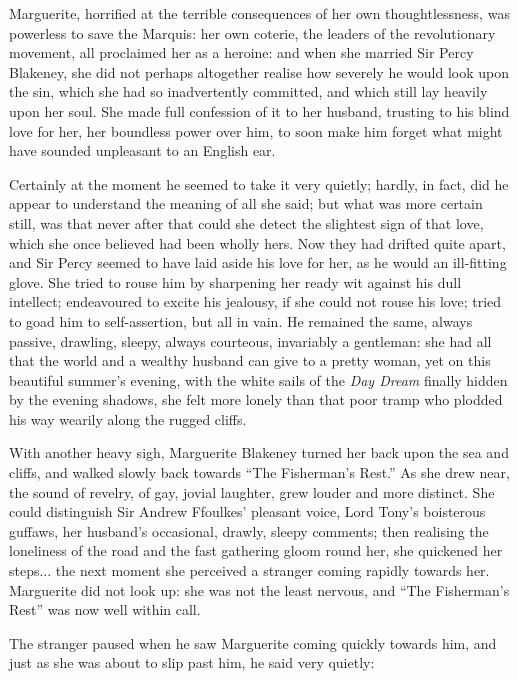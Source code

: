 Marguerite, horrified at the terrible consequences of her own thoughtlessness, was powerless to save the Marquis: her own coterie, the leaders of the revolutionary movement, all proclaimed her as a heroine: and when she married Sir Percy Blakeney, she did not perhaps altogether realise how severely he would look upon the sin, which she had so inadvertently committed, and which still lay heavily upon her soul. She made full confession of it to her husband, trusting to his blind love for her, her boundless power over him, to soon make him forget what might have sounded unpleasant to an English ear.

Certainly at the moment he seemed to take it very quietly; hardly, in fact, did he appear to understand the meaning of all she said; but what was more certain still, was that never after that could she detect the slightest sign of that love, which she once believed had been wholly hers. Now they had drifted quite apart, and Sir Percy seemed to have laid aside his love for her, as he would an ill-fitting glove. She tried to rouse him by sharpening her ready wit against his dull intellect; endeavoured to excite his jealousy, if she could not rouse his love; tried to goad him to self-assertion, but all in vain. He remained the same, always passive, drawling, sleepy, always courteous, invariably a gentleman: she had all that the world and a wealthy husband can give to a pretty woman, yet on this beautiful summer's evening, with the white sails of the \textit{Day Dream} finally hidden by the evening shadows, she felt more lonely than that poor tramp who plodded his way wearily along the rugged cliffs.

With another heavy sigh, Marguerite Blakeney turned her back upon the sea and cliffs, and walked slowly back towards \enquote{The Fisherman's Rest.} As she drew near, the sound of revelry, of gay, jovial laughter, grew louder and more distinct. She could distinguish Sir Andrew Ffoulkes’ pleasant voice, Lord Tony's boisterous guffaws, her husband's occasional, drawly, sleepy comments; then realising the loneliness of the road and the fast gathering gloom round her, she quickened her steps... the next moment she perceived a stranger coming rapidly towards her. Marguerite did not look up: she was not the least nervous, and \enquote{The Fisherman's Rest} was now well within call.

The stranger paused when he saw Marguerite coming quickly towards him, and just as she was about to slip past him, he said very quietly:


